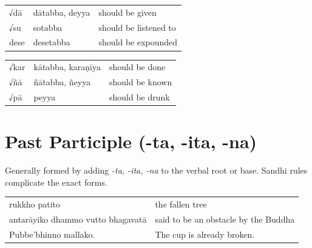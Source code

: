 \documentclass[a4paper]{memoir}
\begin{document}
{\centering\par
\begin{multicols}{2}

\begin{center}
\begin{tabular}{lll}
√dā & dātabba, deyya & should be given\\[0pt]
√su & sotabba & should be listened to\\[0pt]
dese & desetabba & should be expounded\\[0pt]
\end{tabular}
\end{center}

\columnbreak

\begin{center}
\begin{tabular}{lll}
√kar & kātabba, karaṇīya & should be done\\[0pt]
√ñā & ñātabba, ñeyya & should be known\\[0pt]
√pā & peyya & should be drunk\\[0pt]
\end{tabular}
\end{center}

\end{multicols}
\par}

\section{Past Participle (-ta, -ita, -na)}
\label{sec:org06388ec}

Generally formed by adding \emph{-ta, -ita, -na} to the verbal root or base. Sandhi rules complicate the exact forms.

\begin{center}
\begin{tabular}{ll}
rukkho patito & the fallen tree\\[0pt]
antarāyiko dhammo vutto bhagavatā & said to be an obstacle by the Buddha\\[0pt]
Pubbe'bhinno mallako. & The cup is already broken.\\[0pt]
\end{tabular}
\end{center}

\null
\end{document}

